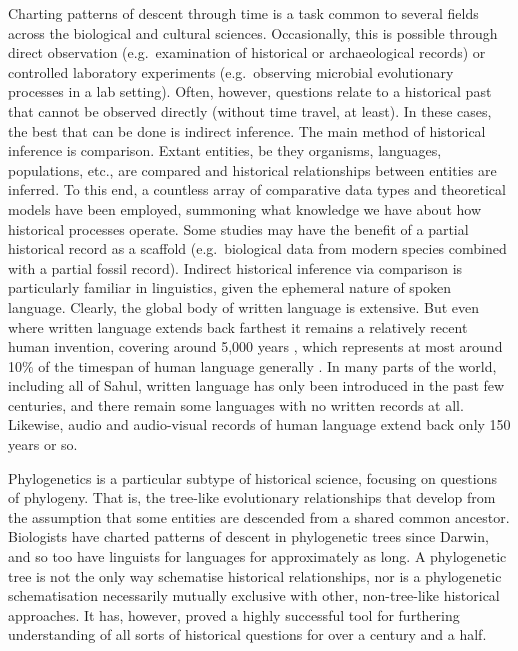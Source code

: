 Charting patterns of descent through time is a task common to several fields across the biological and cultural sciences. Occasionally, this is possible through direct observation (e.g.~examination of historical or archaeological records) or controlled laboratory experiments (e.g.~observing microbial evolutionary processes in a lab setting). Often, however, questions relate to a historical past that cannot be observed directly (without time travel, at least). In these cases, the best that can be done is indirect inference. The main method of historical inference is comparison. Extant entities, be they organisms, languages, populations, etc., are compared and historical relationships between entities are inferred. To this end, a countless array of comparative data types and theoretical models have been employed, summoning what knowledge we have about how historical processes operate. Some studies may have the benefit of a partial historical record as a scaffold (e.g.~biological data from modern species combined with a partial fossil record). Indirect historical inference via comparison is particularly familiar in linguistics, given the ephemeral nature of spoken language. Clearly, the global body of written language is extensive. But even where written language extends back farthest it remains a relatively recent human invention, covering around 5,000 years \autocite{weiss_comparative_2014}, which represents at most around 10\% of the timespan of human language generally \autocite[and probably much less.][]{pagel_q_2017}. In many parts of the world, including all of Sahul, written language has only been introduced in the past few centuries, and there remain some languages with no written records at all. Likewise, audio and audio-visual records of human language extend back only 150 years or so.

Phylogenetics is a particular subtype of historical science, focusing on questions of phylogeny. That is, the tree-like evolutionary relationships that develop from the assumption that some entities are descended from a shared common ancestor. Biologists have charted patterns of descent in phylogenetic trees since Darwin, and so too have linguists for languages for approximately as long. A phylogenetic tree is not the only way schematise historical relationships, nor is a phylogenetic schematisation necessarily mutually exclusive with other, non-tree-like historical approaches. It has, however, proved a highly successful tool for furthering understanding of all sorts of historical questions for over a century and a half.

